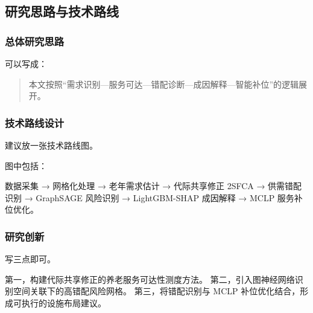 \subsection{研究思路与技术路线}

\subsubsection{总体研究思路}

可以写成：

\begin{quote}
本文按照“需求识别—服务可达—错配诊断—成因解释—智能补位”的逻辑展开。
\end{quote}

\subsubsection{技术路线设计}

建议放一张技术路线图。

图中包括：

数据采集 → 网格化处理 → 老年需求估计 → 代际共享修正 2SFCA → 供需错配识别 → GraphSAGE 风险识别 → LightGBM-SHAP 成因解释 → MCLP 服务补位优化。

\subsubsection{研究创新}

写三点即可。

第一，构建代际共享修正的养老服务可达性测度方法。
第二，引入图神经网络识别空间关联下的高错配风险网格。
第三，将错配识别与 MCLP 补位优化结合，形成可执行的设施布局建议。
